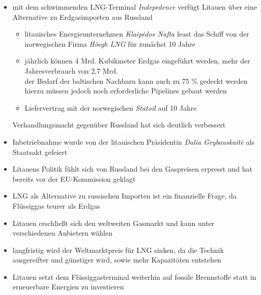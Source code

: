 \documentclass[11pt,a4paper]{article}
\begin{document}
\begin{itemize}

\item mit dem schwimmenden LNG-Terminal \textsl{Indepedence} verfügt Litauen über eine Alternative zu Erdgasimporten aus Russland

	\begin{itemize}
	
	\item litauisches Energieunternehmen \textsl{Klaip\.{e}dos Nafta} least das Schiff von der norwegischen Firma \textsl{Höegh LNG} für zunächst 10 Jahre
	
	\item jährlich können 4 Mrd. Kubikmeter Erdgas eingeführt werden, mehr der Jahresverbrauch von 2,7 Mrd.\\
	 der Bedarf der baltischen Nachbarn kann auch zu 75 \% gedeckt werden\\
	 hierzu müssen jedoch noch erforderliche Pipelines gebaut werden
	
	\item Liefervertrag mit der norwegischen \textsl{Statoil} auf 10 Jahre

	\end{itemize}

 Verhandlungsmacht gegenüber Russland hat sich deutlich verbessert

\item Inbetriebnahme wurde von der litauischen Präsidentin \textsl{Dalia Grybauskait\.{e}} als Staatsakt gefeiert

\item Litauens Politik fühlt sich von Russland bei den Gaspreisen erpresst und hat bereits vor der EU-Kommission geklagt

\item LNG als Alternative zu russischen Importen ist ein finanzielle Frage, da Flüssiggas teurer als Erdgas

\item Litauen erschließt sich den weltweiten Gasmarkt und kann unter verschiedenen Anbietern wählen

\item langfristig wird der Weltmarktpreis für LNG sinken, da die Technik ausgereifter und günstiger wird, sowie mehr Kapazitäten entstehen

\item Litauen setzt dem Flüssiggasterminal weiterhin auf fossile Brennstoffe statt in erneuerbare Energien zu investieren



\end{itemize}
\end{document}
